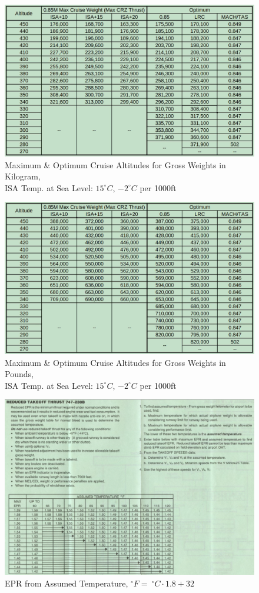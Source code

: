 \documentclass[sim-use, blue_items]{checklist}
\begin{document}
\begin{figure}[ht]
    \centering
	\includegraphics[width=\linewidth]{addenda/maxaltitude_kg_felis.png}
    \caption{Maximum \& Optimum Cruise Altitudes for Gross Weights in Kilogram,\\ISA Temp. at Sea Level: $15^\circ C$, $-2^\circ C$ per 1000ft}
\end{figure}

\begin{figure}[ht]
    \centering
	\includegraphics[width=\linewidth]{addenda/maxaltitude_lb_felis.png}
    \caption{Maximum \& Optimum Cruise Altitudes for Gross Weights in Pounds,\\ISA Temp. at Sea Level: $15^\circ C$, $-2^\circ C$ per 1000ft}
\end{figure}

\begin{figure}[ht]
    \centering
	\includegraphics[width=\linewidth]{addenda/assumed_temp_742.png}
    \caption{EPR from Assumed Temperature, $^\circ F =\ ^\circ C \cdot 1.8 + 32$}
\end{figure}
\end{document}
